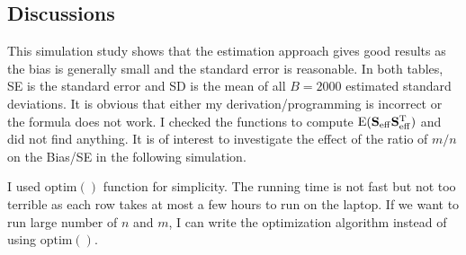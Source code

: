 \documentclass[12pt]{article}
\def\S{{\bf S}}
\def\trans{^{\rm T}}
\def\eff{_{\rm eff}}
\begin{document}
\subsection*{Discussions}
This simulation study shows that the estimation approach gives good results as the bias is generally small and the standard error is reasonable.
In both tables, SE is the standard error and SD is the mean of all $B=2000$ estimated standard deviations.
It is obvious that either my derivation/programming is incorrect or the formula does not work.
I checked the functions to compute $\mathrm{E}(\S\eff\S\eff\trans)$ and did not find anything.
It is of interest to investigate the effect of the ratio of $m/n$ on the Bias/SE in the following simulation.

I used $\mathrm{optim}()$ function for simplicity.
The running time is not fast but not too terrible as each row takes at most a few hours to run on the laptop.
If we want to run large number of $n$ and $m$, I can write the optimization algorithm instead of using $\mathrm{optim}()$.

\newpage


\end{document}
